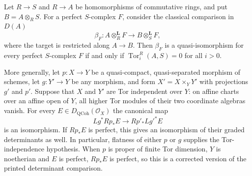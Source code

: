 \begin{proposition}\label{C:determinant-basechange-repair}
Let $R\to S$ and $R\to A$ be homomorphisms of commutative rings,
and put $B=A\otimes_R S$.  For a perfect $S$-complex $F$, consider
the classical comparison in $D(A)$
\[
 \beta_F:A\otimes_R^{\mathbf L}F
       \longrightarrow B\otimes_S^{\mathbf L}F,
\]
where the target is restricted along $A\to B$.
Then $\beta_F$ is a quasi-isomorphism for every perfect $S$-complex
$F$ if and only if $\operatorname{Tor}_i^R(A,S)=0$ for all $i>0$.

More generally, let $p:X\to Y$ be a quasi-compact, quasi-separated
morphism of schemes, let $g:Y'\to Y$ be any morphism, and form
$X'=X\times_Y Y'$ with projections $g'$ and $p'$.  Suppose that
$X$ and $Y'$ are Tor independent over $Y$: on affine charts over
an affine open of $Y$, all higher Tor modules of their two coordinate
algebras vanish.  For every
$E\in D_{\mathrm{QCoh}}(\mathcal O_X)$ the canonical map
\[
 Lg^*Rp_*E\longrightarrow Rp'_*Lg'^*E
\]
is an isomorphism.  If $Rp_*E$ is perfect, this gives an isomorphism
of their graded determinants as well.  In particular, flatness of
either $p$ or $g$ supplies the Tor-independence hypothesis.
When $p$ is proper of finite Tor dimension, $Y$ is noetherian and
$E$ is perfect, $Rp_*E$ is perfect, so this is a corrected version
of the printed determinant comparison.
\end{proposition}
